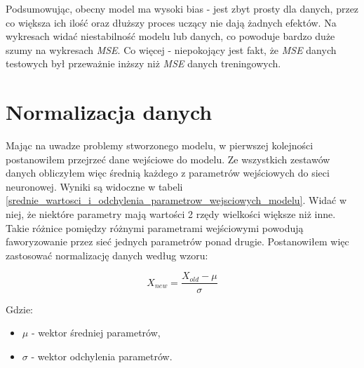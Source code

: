 \documentclass[12pt]{aghdpl}
\begin{document}
		Podsumowując, obecny model ma wysoki bias - jest zbyt prosty dla danych, przez co większa ich ilość oraz dłuższy proces uczący nie dają żadnych efektów. Na wykresach widać niestabilność modelu lub danych, co powoduje bardzo duże szumy na wykresach \textit{MSE}. Co więcej - niepokojący jest fakt, że \textit{MSE} danych testowych był przeważnie inższy niż \textit{MSE} danych treningowych.
		
		\section{Normalizacja danych}
		Mając na uwadze problemy stworzonego modelu, w pierwszej kolejności postanowiłem przejrzeć dane wejściowe do modelu. Ze wszystkich zestawów danych obliczyłem więc średnią każdego z parametrów wejściowych do sieci neuronowej. Wyniki są widoczne w tabeli \ref{srednie_wartosci_i_odchylenia_parametrow_wejsciowych_modelu}. Widać w niej, że niektóre parametry mają wartości 2 rzędy wielkości większe niż inne. Takie różnice pomiędzy różnymi parametrami wejściowymi powodują faworyzowanie przez sieć jednych parametrów ponad drugie. Postanowiłem więc zastosować normalizację danych według wzoru:
		
		\begin{equation}
		X_{new} = \frac{X_{old} - \mu}{\sigma}
		\end{equation}		 
		
		Gdzie:
		\begin{itemize}
		\item $\mu$ - wektor średniej parametrów,
		\item $\sigma$ - wektor odchylenia parametrów.
		\end{itemize}
		
\end{document}
